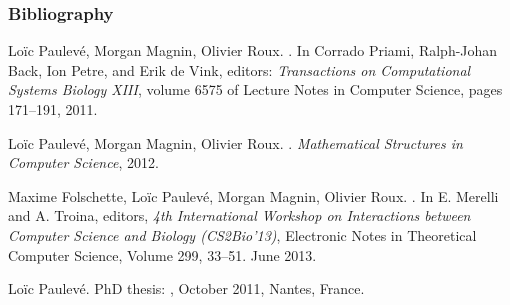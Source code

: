 
\begin{frame}[c]
  \frametitle{Bibliography}

\small
\setlength{\parindent}{-1em}
\setlength{\parskip}{0.5em}

\tcitebullet Loïc Paulevé, Morgan Magnin, Olivier Roux. . In Corrado Priami, Ralph-Johan Back, Ion Petre, and Erik de Vink, editors: \textit{Transactions on Computational Systems Biology XIII}, volume 6575 of Lecture Notes in Computer Science, pages 171--191, 2011.

\tcitebullet Loïc Paulevé, Morgan Magnin, Olivier Roux. . \textit{Mathematical Structures in Computer Science}, 2012.




\tcitebullet Maxime Folschette, Loïc Paulevé, Morgan Magnin, Olivier Roux. . In E. Merelli and A. Troina, editors, \textit{4th International Workshop on Interactions between Computer Science and Biology (CS2Bio’13)}, Electronic Notes in Theoretical Computer Science, Volume 299, 33–51. June 2013.

\tcitebullet Loïc Paulevé. PhD thesis: , October 2011, Nantes, France.



\end{frame}
